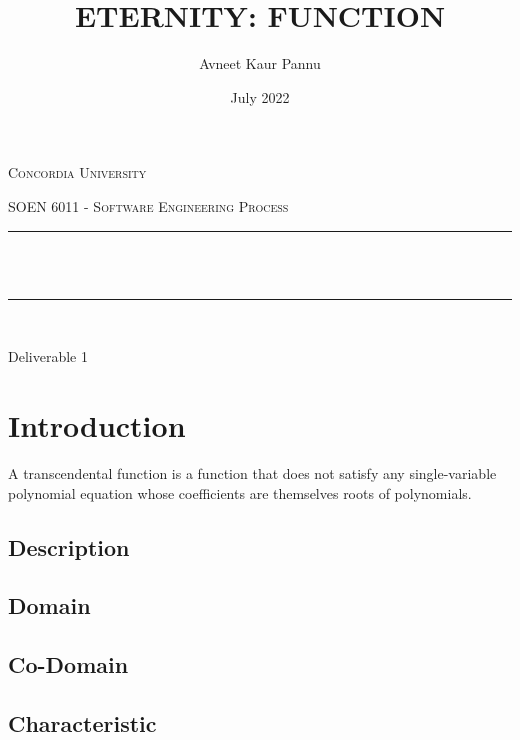 \documentclass[12pt]{report}
\title{ETERNITY: FUNCTION}
\author{Avneet Kaur Pannu}
\date{July 2022}
\makeatletter
\let\thetitle\@title
\makeatother
\begin{document}
\begin{titlepage}
	\centering
    \vspace*{0.5 cm}
\begin{center}    \textsc{\Large Concordia University}\\[2.0 cm]	\end{center}
	\textsc{\Large  SOEN 6011 - Software Engineering Process }\\[0.5 cm]
	\rule{\linewidth}{0.2 mm} \\[0.4 cm]
	{ \huge \textbf \thetitle}\\[0.2 cm]
	{ \huge \textbf{}}
	\rule{\linewidth}{0.2 mm} \\[1.5 cm]

\begin{center}   {\Large Deliverable 1}\\[2.0 cm]
	
\end{center}
	
\end{titlepage}

\renewcommand{\thesection}{\arabic{section}}
\tableofcontents
\pagebreak



\section{Introduction}
A transcendental function is a function that does not satisfy any single-variable polynomial equation whose coefficients are themselves roots of polynomials.
\subsection{Description}

\subsection{Domain}

\subsection{Co-Domain}

\subsection{Characteristic}
\end{document}
